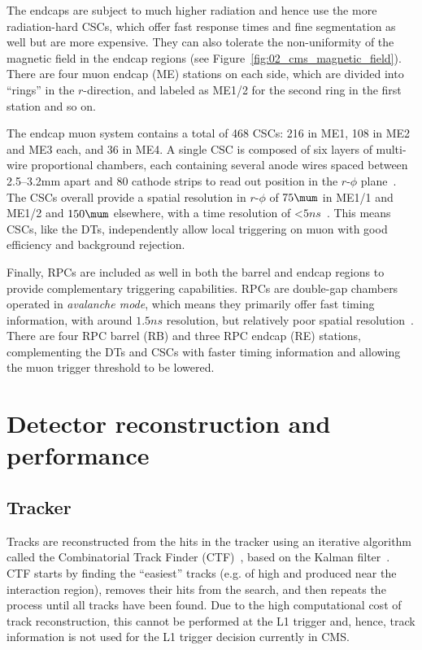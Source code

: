 The endcaps are subject to much higher radiation and hence use the more radiation-hard CSCs, which offer fast response times and fine segmentation as well but are more expensive.
They can also tolerate the non-uniformity of the magnetic field in the endcap regions (see Figure~\ref{fig:02_cms_magnetic_field}).
There are four muon endcap (ME) stations on each side, which are divided into ``rings'' in the $r$-direction, and labeled as ME1/2 for the second ring in the first station and so on.

The endcap muon system contains a total of 468 CSCs: 216 in ME1, 108 in ME2 and ME3 each, and 36 in ME4.
A single CSC is composed of six layers of multi-wire proportional chambers, each containing several anode wires spaced between 2.5--3.2\unit{mm} apart and 80 cathode strips to read out position in the $r$-$\phi$ plane~\cite{CMS:2013vyz}.
The CSCs overall provide a spatial resolution in $r$-$\phi$ of $75\mum$ in ME1/1 and ME1/2 and $150\mum$ elsewhere, with a time resolution of <$5\unit{ns}$~\cite{CMS:2008xjf}.
This means CSCs, like the DTs, independently allow local triggering on muon \pt with good efficiency and background rejection.

Finally, RPCs are included as well in both the barrel and endcap regions to provide complementary triggering capabilities.
RPCs are double-gap chambers operated in \textit{avalanche mode}, which means they primarily offer fast timing information, with around $1.5\unit{ns}$ resolution, but relatively poor spatial resolution~\cite{Hebbeker:2017bix}.
There are four RPC barrel (RB) and three RPC endcap (RE) stations, complementing the DTs and CSCs with faster timing information and allowing the muon \pt trigger threshold to be lowered.


\section{Detector reconstruction and performance}
\label{sec:02_cms_reconstruction}

\subsection{Tracker}

Tracks are reconstructed from the hits in the tracker using an iterative algorithm called the Combinatorial Track Finder (CTF)~\cite{CMS:2014pgm}, based on the Kalman filter~\cite{Fruhwirth:1987fm}.
CTF starts by finding the ``easiest'' tracks (e.g. of high \pt and produced near the interaction region), removes their hits from the search, and then repeats the process until all tracks have been found.
Due to the high computational cost of track reconstruction, this cannot be performed at the L1 trigger and, hence, track information is not used for the L1 trigger decision currently in CMS.

